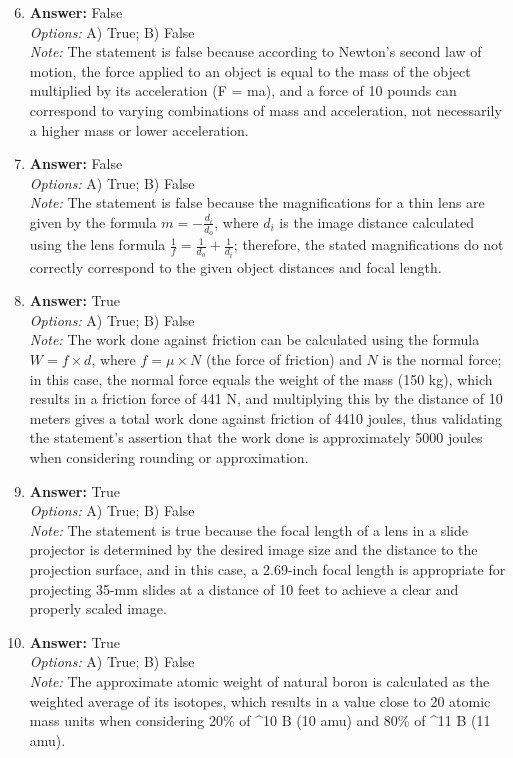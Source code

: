 \documentclass[12pt]{article}
\begin{document}
\begin{enumerate}[label=\arabic*.]
\setcounter{enumi}{5}
\item \textbf{Answer:} False
\\ \textit{Options:} A) True; B) False
\\ \textit{Note:} The statement is false because according to Newton's second law of motion, the force applied to an object is equal to the mass of the object multiplied by its acceleration (F = ma), and a force of 10 pounds can correspond to varying combinations of mass and acceleration, not necessarily a higher mass or lower acceleration.
\item \textbf{Answer:} False
\\ \textit{Options:} A) True; B) False
\\ \textit{Note:} The statement is false because the magnifications for a thin lens are given by the formula \( m = -\frac{d_i}{d_o} \), where \( d_i \) is the image distance calculated using the lens formula \( \frac{1}{f} = \frac{1}{d_o} + \frac{1}{d_i} \); therefore, the stated magnifications do not correctly correspond to the given object distances and focal length.
\item \textbf{Answer:} True
\\ \textit{Options:} A) True; B) False
\\ \textit{Note:} The work done against friction can be calculated using the formula \( W = f \times d \), where \( f = \mu \times N \) (the force of friction) and \( N \) is the normal force; in this case, the normal force equals the weight of the mass (150 kg), which results in a friction force of 441 N, and multiplying this by the distance of 10 meters gives a total work done against friction of 4410 joules, thus validating the statement's assertion that the work done is approximately 5000 joules when considering rounding or approximation.
\item \textbf{Answer:} True
\\ \textit{Options:} A) True; B) False
\\ \textit{Note:} The statement is true because the focal length of a lens in a slide projector is determined by the desired image size and the distance to the projection surface, and in this case, a 2.69-inch focal length is appropriate for projecting 35-mm slides at a distance of 10 feet to achieve a clear and properly scaled image.
\item \textbf{Answer:} True
\\ \textit{Options:} A) True; B) False
\\ \textit{Note:} The approximate atomic weight of natural boron is calculated as the weighted average of its isotopes, which results in a value close to 20 atomic mass units when considering 20\% of ^10 B (10 amu) and 80\% of ^11 B (11 amu).
\end{enumerate}
\end{document}
